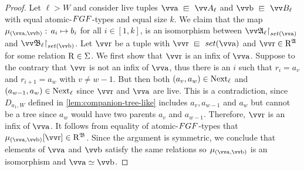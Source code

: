 \begin{proof}
Let $\ell > W$ and consider live tuples $\elemtuptuplea \sqin \unraveldom{A}_{\ell}$ and $\elemtuptupleb \sqin \unraveldom{B}_{\ell}$ with equal atomic-$\FGF$-types and equal size $k$.
We claim that the map $\mu_{(\elemtuptuplea, \elemtuptupleb)}:\, a_{i} \mapsto b_{i}$ for all $i \in [1, k]$, is an isomorphism between $\restr{\str{\unravel{A}_{\ell}}}{\set(\elemtuptuplea)}$ and $\restr{\str{\unravel{B}_{\ell}}}{\set(\elemtuptupleb)}$.
Let $\elemtuptupler$ be a tuple with $\elemtuptupler \sqin \set(\elemtuptuplea)$ and $\elemtuptupler \in \relR^{\str{A}}$ for some relation $\mathrm{R} \in \Sigma$.
We first show that $\elemtuptupler$ is an infix of $\elemtuptuplea$.
Suppose to the contrary that $\elemtuptupler$ is not an infix of $\elemtuptuplea$, thus there is an $i$ such that $r_{i} = a_{v}$ and $r_{i+1} = a_{w}$ with $v \ne w - 1$.
But then both $(a_{v}, a_{w}) \in \mathrm{Next}_{\ell}$ and $(a_{w-1}, a_{w}) \in \mathrm{Next}_{\ell}$ since $\elemtuptupler$ and $\elemtuptuplea$ are live.
This is a contradiction, since $D_{a_{1}, W}$ defined in \cref{lem:companion-tree-like} includes $a_{v}, a_{w-1}$ and $a_{w}$ but cannot be a tree since $a_{w}$ would have two parents $a_{v}$ and $a_{w-1}$.
Therefore, $\elemtuptupler$ is an infix of $\elemtuptuplea$.
It follows from equality of atomic-$\FGF$-types that $\mu_{(\elemtuptuplea, \elemtuptupleb)}[\elemtuptupler] \in \relR^{\str{B}}$.
Since the argument is symmetric, we conclude that elements of $\elemtuptuplea$ and $\elemtuptupleb$ satisfy the same relations so $\mu_{(\elemtuptuplea, \elemtuptupleb)}$ is an isomorphism and $\elemtuptuplea \simeq \elemtuptupleb$.
\end{proof}

